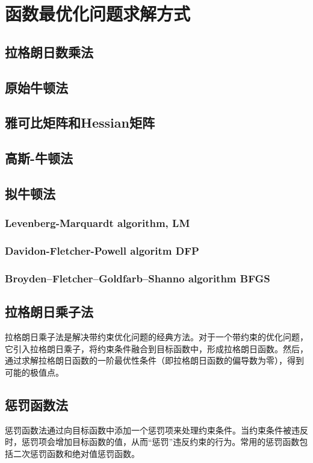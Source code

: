 \chapter{函数最优化问题求解方式}\label{MathTools:chap:optimization}
\section{拉格朗日数乘法}
\section{原始牛顿法}\label{MathTools:sec:newton_method}
\section{雅可比矩阵和Hessian矩阵}\label{MathTools:sec:jacobian_hessian}
\section{高斯-牛顿法}\label{MathTools:sec:gauss_newton}
\section{拟牛顿法}\label{MathTools:sec:quasi_newton}
\subsection{Levenberg-Marquardt algorithm, LM}\label{MathTools:sec:lm}
\subsection{Davidon-Fletcher-Powell algoritm DFP}\label{MathTools:sec:dfp}
\subsection{Broyden–Fletcher–Goldfarb–Shanno algorithm BFGS}\label{MathTools:sec:bfgs}

\section{拉格朗日乘子法}
拉格朗日乘子法是解决带约束优化问题的经典方法。对于一个带约束的优化问题，它引入拉格朗日乘子，将约束条件融合到目标函数中，形成拉格朗日函数。然后，通过求解拉格朗日函数的一阶最优性条件（即拉格朗日函数的偏导数为零），得到可能的极值点。
\section{惩罚函数法}
惩罚函数法通过向目标函数中添加一个惩罚项来处理约束条件。当约束条件被违反时，惩罚项会增加目标函数的值，从而“惩罚”违反约束的行为。常用的惩罚函数包括二次惩罚函数和绝对值惩罚函数。
